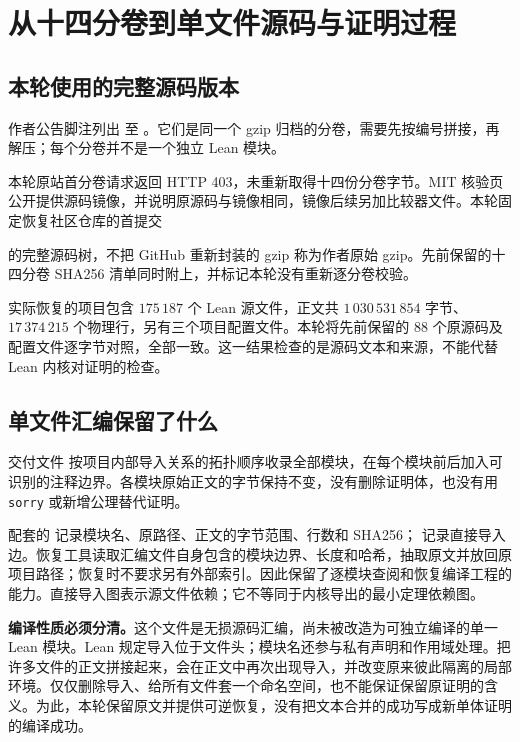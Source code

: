 \chapter{从十四分卷到单文件源码与证明过程}
\label{chap:source-delivery}
\section{本轮使用的完整源码版本}
作者公告脚注列出  至 。它们是同一个 gzip 归档的分卷，需要先按编号拼接，再解压；每个分卷并不是一个独立 Lean 模块。

本轮原站首分卷请求返回 HTTP 403，未重新取得十四份分卷字节。MIT 核验页公开提供源码镜像，并说明原源码与镜像相同，镜像后续另加比较器文件。本轮固定恢复社区仓库的首提交
\begin{quote}\small
{}
\end{quote}
的完整源码树，不把 GitHub 重新封装的 gzip 称为作者原始 gzip。先前保留的十四分卷 SHA256 清单同时附上，并标记本轮没有重新逐分卷校验。

实际恢复的项目包含 $175\,187$ 个 Lean 源文件，正文共 $1\,030\,531\,854$ 字节、$17\,374\,215$ 个物理行，另有三个项目配置文件。本轮将先前保留的 $88$ 个原源码及配置文件逐字节对照，全部一致。这一结果检查的是源码文本和来源，不能代替 Lean 内核对证明的检查。

\section{单文件汇编保留了什么}
交付文件  按项目内部导入关系的拓扑顺序收录全部模块，在每个模块前后加入可识别的注释边界。各模块原始正文的字节保持不变，没有删除证明体，也没有用 \texttt{sorry} 或新增公理替代证明。

配套的  记录模块名、原路径、正文的字节范围、行数和 SHA256； 记录直接导入边。恢复工具读取汇编文件自身包含的模块边界、长度和哈希，抽取原文并放回原项目路径；恢复时不要求另有外部索引。因此保留了逐模块查阅和恢复编译工程的能力。直接导入图表示源文件依赖；它不等同于内核导出的最小定理依赖图。

\textbf{编译性质必须分清。}这个文件是无损源码汇编，尚未被改造为可独立编译的单一 Lean 模块。Lean 规定导入位于文件头；模块名还参与私有声明和作用域处理。把许多文件的正文拼接起来，会在正文中再次出现导入，并改变原来彼此隔离的局部环境。仅仅删除导入、给所有文件套一个命名空间，也不能保证保留原证明的含义。为此，本轮保留原文并提供可逆恢复，没有把文本合并的成功写成新单体证明的编译成功。

